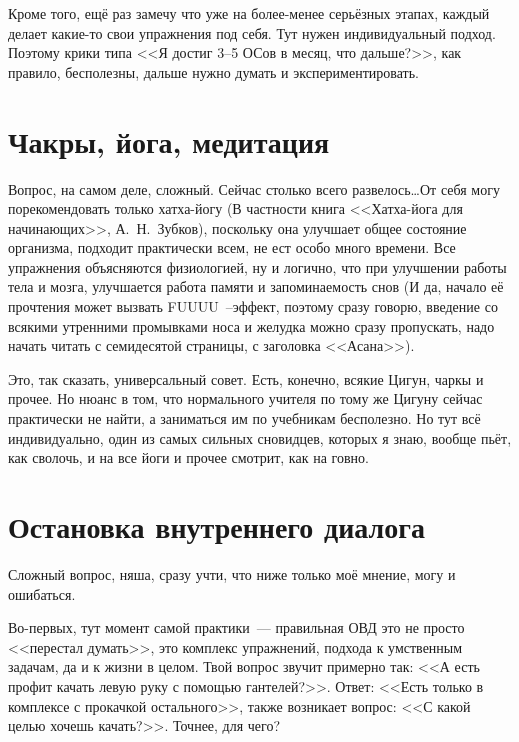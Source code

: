 \documentclass[a5paper,12pt,twoside]{memoir}
\begin{document}
Кроме того, ещё раз замечу что уже на более-менее серьёзных этапах, каждый делает какие-то свои упражнения под себя. Тут нужен индивидуальный подход. Поэтому крики типа <<Я достиг 3--5 ОСов в месяц, что дальше?>>, как правило, бесполезны, дальше нужно думать и экспериментировать.




\section{Чакры, йога, медитация}

Вопрос, на самом деле, сложный. Сейчас столько всего развелось\ldots От себя могу порекомендовать только хатха-йогу (В частности книга <<Хатха-йога для начинающих>>, А.\, Н.~Зубков), поскольку она улучшает общее состояние организма, подходит практически всем, не ест особо много времени. Все упражнения объясняются физиологией, ну и логично, что при улучшении работы тела и мозга, улучшается работа памяти и запоминаемость снов (И да, начало её прочтения может вызвать FUUUU~–эффект, поэтому сразу говорю, введение со всякими утренними промывками носа и желудка можно сразу пропускать, надо начать читать с семидесятой страницы, с заголовка <<Асана>>).

Это, так сказать, универсальный совет. Есть, конечно, всякие Цигун, чаркы и прочее. Но нюанс в том, что нормального учителя по тому же Цигуну сейчас практически не найти, а заниматься им по учебникам бесполезно. Но тут всё индивидуально, один из самых сильных сновидцев, которых я знаю, вообще пьёт, как сволочь, и на все йоги и прочее смотрит, как на говно.




\section{Остановка внутреннего диалога}

\medskip
Сложный вопрос, няша, сразу учти, что ниже только моё мнение, могу и ошибаться. 

Во-первых, тут момент самой практики~--- правильная ОВД это не просто <<перестал думать>>, это комплекс упражнений, подхода к умственным задачам, да и к жизни в целом. Твой вопрос звучит примерно так: <<А есть профит качать левую руку с помощью гантелей?>>. Ответ: <<Есть только в комплексе с прокачкой остального>>, также возникает вопрос: <<С какой целью хочешь качать?>>. Точнее, для чего?
\end{document}
